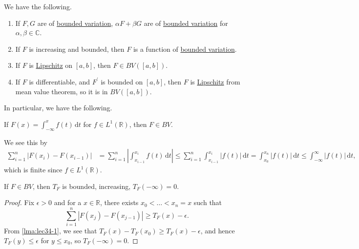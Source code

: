 \begin{remark}
	We have the following.
	\begin{enumerate}[(1)]
		\item If \(F,G\) are of \hyperref[def:bounded-variation]{bounded variation}, \(\alpha F + \beta G\) are of \hyperref[def:bounded-variation]{bounded variation}
		      for \(\alpha , \beta \in \mathbb{C} \).
		\item If \(F\) is increasing and bounded, then \(F\) is a function of \hyperref[def:bounded-variation]{bounded variation}.
		\item If \(F\) is \hyperref[def:Lipschitz]{Lipschitz} on \([a,b]\), then \(F \in BV([a,b])\).
		\item If \(F\) is differentiable, and \(F^\prime\) is bounded on \([a,b]\), then \(F\) is \hyperref[def:Lipschitz]{Lipschitz} from mean value theorem,
		      so it is in \(BV([a,b])\).
	\end{enumerate}
\end{remark}

In particular, we have the following.
\begin{remark}
	If \(F(x) = \int_{-\infty}^x f(t) \,\mathrm{d} t\) for \(f \in L^1(\mathbb{R})\), then \(F \in BV\).
\end{remark}
\begin{explanation}
	We see this by
	\[
		\begin{split}
			\sum_{i=1}^n \left\vert F(x_i) - F(x_{i-1}) \right\vert &= \sum_{i=1}^n \left\vert \int_{x_{i-1}}^{x_i} f(t) \,\mathrm{d} t \right\vert
			\leq \sum_{i=1}^n \int_{x_{i-1}}^{x_i} \left\vert f(t) \right\vert \,\mathrm{d} t
			= \int_{x_0}^{x_n} \left\vert f(t) \right\vert \,\mathrm{d} t
			\leq \int_{-\infty}^\infty \left\vert f(t) \right\vert \,\mathrm{d} t,
		\end{split}
	\]
	which is finite since \(f\in L^1(\mathbb{R} )\).
\end{explanation}

\begin{lemma}\label{lma:lec34-2}
	If \(F \in BV\), then \(T_F\) is bounded, increasing, \(T_F(-\infty) = 0\).
\end{lemma}
\begin{proof}
	Fix \(\epsilon > 0\) and for a \(x\in \mathbb{R} \), there exists \(x_0 < \dots < x_n = x \) such that
	\[
		\sum\limits_{i=1}^{n} \left\vert F(x_{j} ) - F(x_{j-1})\right\vert \geq T_{F} (x) - \epsilon.
	\]
	From \autoref{lma:lec34-1}, we see that \(T_{F} (x) - T_{F} (x_0) \geq T_{F} (x) - \epsilon \), and hence
	\(T_{F} (y) \leq \epsilon \) for \(y\leq x_0\), so \(T_{F} (-\infty ) = 0\).
\end{proof}

